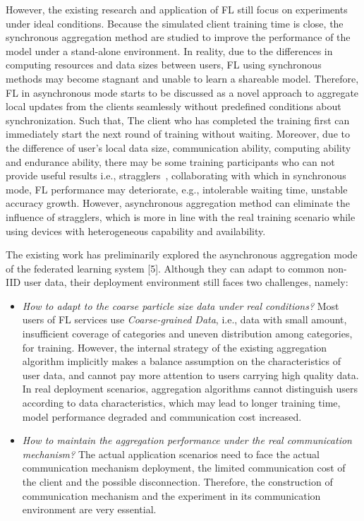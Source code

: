 \documentclass[twoside,twocolumn]{article}
\begin{document}
	However, the existing research and application of FL still focus on experiments under ideal conditions. Because the simulated client training time is close, the synchronous aggregation method are studied to improve the performance of the model under a stand-alone environment. In reality, due to the differences in computing resources and data sizes between users, FL using synchronous methods may become stagnant and unable to learn a shareable model. Therefore, FL in asynchronous mode starts to be discussed as a novel approach to aggregate local updates from the clients seamlessly without predefined conditions about synchronization. Such that, The client who has completed the training first can immediately start the next round of training without waiting. Moreover, due to the difference of user's local data size, communication ability, computing ability and endurance ability, there may be some training participants who can not provide useful results i.e., stragglers~\cite{liu2022fed2a}, collaborating with which in synchronous mode, FL performance may deteriorate, e.g., intolerable waiting time, unstable accuracy growth. However, asynchronous aggregation method can eliminate the influence of stragglers, which is more in line with the real training scenario while using devices with heterogeneous capability and availability.

	The existing work has preliminarily explored the asynchronous aggregation mode of the federated learning system [5]. Although they can adapt to common non-IID user data, their deployment environment still faces two challenges, namely:
	\begin{itemize}
	\item \emph{How to adapt to the coarse particle size data under real conditions?}
	Most users of FL services use \emph{Coarse-grained Data}, i.e., data with small amount, insufficient coverage of categories and uneven distribution among categories, for training. However, the internal strategy of the existing aggregation algorithm implicitly makes a balance assumption on the characteristics of user data, and cannot pay more attention to users carrying high quality data. In real deployment scenarios, aggregation algorithms cannot distinguish users according to data characteristics, which may lead to longer training time, model performance degraded and communication cost increased.
	\item \emph{How to maintain the aggregation performance under the real communication mechanism?}
	The actual application scenarios need to face the actual communication mechanism deployment, the limited communication cost of the client and the possible disconnection. Therefore, the construction of communication mechanism and the experiment in its communication environment are very essential.
	\end{itemize}
	
\end{document}

